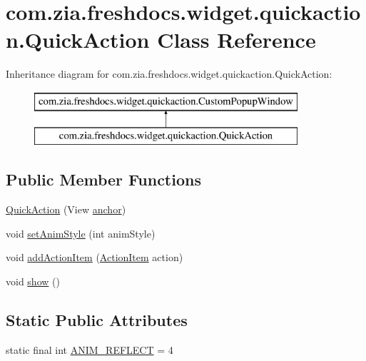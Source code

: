 \hypertarget{classcom_1_1zia_1_1freshdocs_1_1widget_1_1quickaction_1_1_quick_action}{\section{com.\-zia.\-freshdocs.\-widget.\-quickaction.\-Quick\-Action Class Reference}
\label{classcom_1_1zia_1_1freshdocs_1_1widget_1_1quickaction_1_1_quick_action}
}
Inheritance diagram for com.\-zia.\-freshdocs.\-widget.\-quickaction.\-Quick\-Action\-:\begin{figure}[H]
\begin{center}
\leavevmode
\includegraphics[height=2.000000cm]{classcom_1_1zia_1_1freshdocs_1_1widget_1_1quickaction_1_1_quick_action}
\end{center}
\end{figure}
\subsection*{Public Member Functions}
\begin{DoxyCompactItemize}
\item 
\hyperlink{classcom_1_1zia_1_1freshdocs_1_1widget_1_1quickaction_1_1_quick_action_a9a083b4e5ca32822b6e7a9daa4e05b5a}{Quick\-Action} (View \hyperlink{classcom_1_1zia_1_1freshdocs_1_1widget_1_1quickaction_1_1_custom_popup_window_a2ddc37724854869179d0c674580dce1b}{anchor})
\item 
void \hyperlink{classcom_1_1zia_1_1freshdocs_1_1widget_1_1quickaction_1_1_quick_action_a98e1e432aa9414a78cb49896b22b5616}{set\-Anim\-Style} (int anim\-Style)
\item 
void \hyperlink{classcom_1_1zia_1_1freshdocs_1_1widget_1_1quickaction_1_1_quick_action_addfe900c585d3919e22c1c3de38f86c9}{add\-Action\-Item} (\hyperlink{classcom_1_1zia_1_1freshdocs_1_1widget_1_1quickaction_1_1_action_item}{Action\-Item} action)
\item 
void \hyperlink{classcom_1_1zia_1_1freshdocs_1_1widget_1_1quickaction_1_1_quick_action_a03f3535b4efa711beff5a644f4570108}{show} ()
\end{DoxyCompactItemize}
\subsection*{Static Public Attributes}
\begin{DoxyCompactItemize}
\item 
static final int \hyperlink{classcom_1_1zia_1_1freshdocs_1_1widget_1_1quickaction_1_1_quick_action_a875969b96fae990544179be5f4de4ba0}{A\-N\-I\-M\-\_\-\-R\-E\-F\-L\-E\-C\-T} = 4
\end{DoxyCompactItemize}
